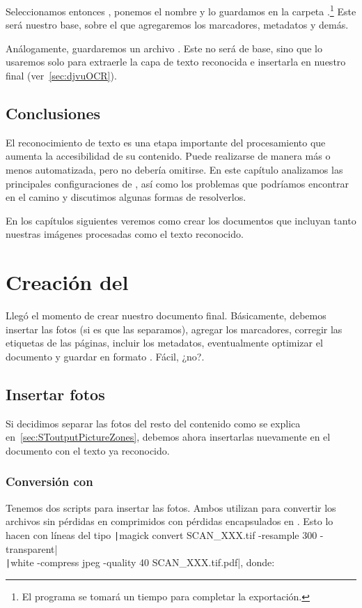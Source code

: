 \documentclass[%
	a5paper,
	10pt,
	twoside,
	openright,
	final,
]{memoir}
\begin{document}
	Seleccionamos entonces , ponemos el nombre  y lo guardamos en la carpeta .\footnote{El programa se tomará un tiempo para completar la exportación.} Este será nuestro \pdf base, sobre el que agregaremos los marcadores, metadatos y demás.

	Análogamente, guardaremos un archivo . Este no será de base, sino que lo usaremos solo para extraerle la capa de texto reconocida e insertarla en nuestro \djvu final (ver~\ref{sec:djvuOCR}).

	\section{Conclusiones} El reconocimiento de texto es una etapa importante del procesamiento que aumenta la accesibilidad de su contenido. Puede realizarse de manera más o menos automatizada, pero no debería omitirse. En este capítulo analizamos las principales configuraciones de \abby, así como los problemas que podríamos encontrar en el camino y discutimos algunas formas de resolverlos.

	En los capítulos siguientes veremos como crear los documentos que incluyan tanto nuestras imágenes procesadas como el texto reconocido.

	\chapter{Creación del \texorpdfstring{\pdf}{PDF}} Llegó el momento de crear nuestro documento \pdf final. Básicamente, debemos insertar las fotos (si es que las separamos), agregar los marcadores, corregir las etiquetas de las páginas, incluir los metadatos, eventualmente optimizar el documento y guardar en formato \pdfa. Fácil, ¿no?.

	\section{Insertar fotos\label{sec:pdfPhotos}} Si decidimos separar las fotos del resto del contenido como se explica en~\ref{sec:SToutputPictureZones}, debemos ahora insertarlas nuevamente en el documento con el texto ya reconocido.

	\subsection{Conversión con \imagemagick\label{sec:pdfPhotosImageMagick}} Tenemos dos scripts para insertar las fotos. Ambos utilizan \imagemagick para convertir los archivos \tiff sin pérdidas en \jpeg comprimidos con pérdidas encapsulados en \pdf. Esto lo hacen con líneas del tipo \texttt|magick convert SCAN_XXX.tif -resample 300 -transparent|\\
	\texttt|white -compress jpeg -quality 40 SCAN_XXX.tif.pdf|, donde:
\end{document}
